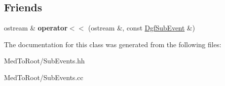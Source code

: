 \subsection*{Friends}
\begin{DoxyCompactItemize}
\item 
\mbox{\label{class_dgf_sub_event_a98fb82e2308f57cabcdf001424381c3e}} 
ostream \& {\bfseries operator$<$$<$} (ostream \&, const \hyperlink{class_dgf_sub_event}{Dgf\+Sub\+Event} \&)
\end{DoxyCompactItemize}


The documentation for this class was generated from the following files\+:\begin{DoxyCompactItemize}
\item 
Med\+To\+Root/Sub\+Events.\+hh\item 
Med\+To\+Root/Sub\+Events.\+cc\end{DoxyCompactItemize}
